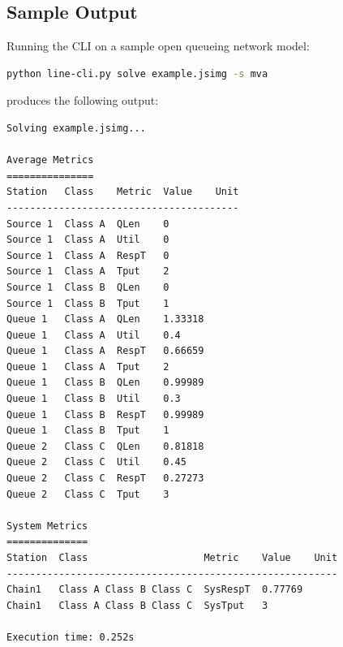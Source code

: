 \subsection{Sample Output}
Running the CLI on a sample open queueing network model:
\begin{lstlisting}[language=bash, basicstyle=\ttfamily\footnotesize]
python line-cli.py solve example.jsimg -s mva
\end{lstlisting}
produces the following output:
\begin{lstlisting}[basicstyle=\ttfamily\scriptsize]
Solving example.jsimg...

Average Metrics
===============
Station   Class    Metric  Value    Unit
----------------------------------------
Source 1  Class A  QLen    0
Source 1  Class A  Util    0
Source 1  Class A  RespT   0
Source 1  Class A  Tput    2
Source 1  Class B  QLen    0
Source 1  Class B  Tput    1
Queue 1   Class A  QLen    1.33318
Queue 1   Class A  Util    0.4
Queue 1   Class A  RespT   0.66659
Queue 1   Class A  Tput    2
Queue 1   Class B  QLen    0.99989
Queue 1   Class B  Util    0.3
Queue 1   Class B  RespT   0.99989
Queue 1   Class B  Tput    1
Queue 2   Class C  QLen    0.81818
Queue 2   Class C  Util    0.45
Queue 2   Class C  RespT   0.27273
Queue 2   Class C  Tput    3

System Metrics
==============
Station  Class                    Metric    Value    Unit
---------------------------------------------------------
Chain1   Class A Class B Class C  SysRespT  0.77769
Chain1   Class A Class B Class C  SysTput   3

Execution time: 0.252s
\end{lstlisting}






